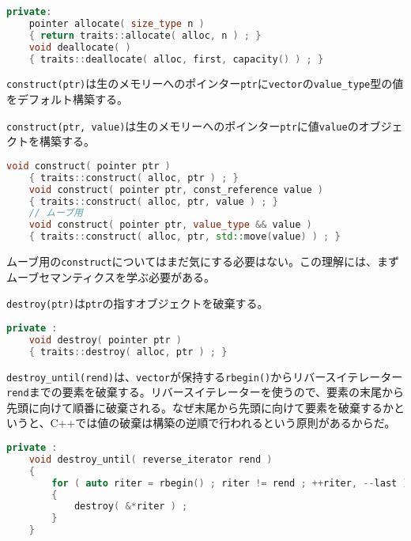 \begin{lstlisting}[language={C++}]
private: 
    pointer allocate( size_type n )
    { return traits::allocate( alloc, n ) ; }
    void deallocate( )
    { traits::deallocate( alloc, first, capacity() ) ; }
\end{lstlisting}


\texttt{construct(ptr)}は生のメモリーへのポインター\texttt{ptr}に\texttt{vector}の\texttt{value\_type}型の値をデフォルト構築する。

\texttt{construct(ptr, value)}は生のメモリーへのポインター\texttt{ptr}に値\texttt{value}のオブジェクトを構築する。

\ifTombow\pagebreak\fi
\begin{lstlisting}[language={C++}]
    void construct( pointer ptr )
    { traits::construct( alloc, ptr ) ; }
    void construct( pointer ptr, const_reference value )
    { traits::construct( alloc, ptr, value ) ; }
    // ムーブ用
    void construct( pointer ptr, value_type && value )
    { traits::construct( alloc, ptr, std::move(value) ) ; }
\end{lstlisting}

ムーブ用の\texttt{construct}についてはまだ気にする必要はない。この理解には、まずムーブセマンティクスを学ぶ必要がある。

\texttt{destroy(ptr)}は\texttt{ptr}の指すオブジェクトを破棄する。

\begin{lstlisting}[language={C++}]
private :
    void destroy( pointer ptr )
    { traits::destroy( alloc, ptr ) ; }
\end{lstlisting}


\texttt{destroy\_until(rend)}は、\texttt{vector}が保持する\texttt{rbegin()}からリバースイテレーター\texttt{rend}までの要素を破棄する。リバースイテレーターを使うので、要素の末尾から先頭に向けて順番に破棄される。なぜ末尾から先頭に向けて要素を破棄するかというと、C++では値の破棄は構築の逆順で行われるという原則があるからだ。

\begin{lstlisting}[language={C++}]
private :
    void destroy_until( reverse_iterator rend )
    {
        for ( auto riter = rbegin() ; riter != rend ; ++riter, --last )
        {
            destroy( &*riter ) ;
        }
    }
\end{lstlisting}

